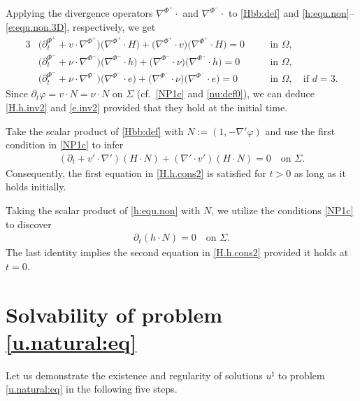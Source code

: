 \documentclass[twoside,11pt]{article}
\numberwithin{equation}{section}
\def\p{\partial}
\begin{document}
Applying the divergence operators $\nabla^{\Phi^+}\cdot$
and $\nabla^{\Phi^-}\cdot$ to \eqref{Hbb:def} and \eqref{h:equ.non}--\eqref{e:equ.non.3D}, respectively, we get
\begin{alignat*}{3}
	&\big(\p_t^{\Phi^+}+v\cdot\nabla^{\Phi^+}\big)\big(\nabla^{\Phi^+}\cdot H\big)+\big(\nabla^{\Phi^+}\cdot v\big)\big(\nabla^{\Phi^+}\cdot H\big)=0\quad&&\textrm{in \ }\Omega,\\
	&\big(\p_t^{\Phi^-}+\nu \cdot\nabla^{\Phi^-}\big)\big(\nabla^{\Phi^-}\cdot h\big)+\big(\nabla^{\Phi^-}\cdot \nu \big)\big(\nabla^{\Phi^-}\cdot h\big)=0\quad&&\textrm{in \ }\Omega,\\
	&\big(\p_t^{\Phi^-}+\nu \cdot\nabla^{\Phi^-}\big)\big(\nabla^{\Phi^-}\cdot e\big)+\big(\nabla^{\Phi^-}\cdot \nu \big)\big(\nabla^{\Phi^-}\cdot e\big)=0\quad&&\textrm{in \ }\Omega,
	\quad\textrm{if }d=3.
\end{alignat*}
Since $\p_t\varphi=v \cdot N=\nu \cdot N$ on $\Sigma$ (cf.~\eqref{NP1c} and \eqref{nu:def0}),
we can deduce \eqref{H.h.inv2} and \eqref{e.inv2} provided that they hold at the initial time.
	
Take the scalar product of \eqref{Hbb:def} with $N:=(1, -\nabla'\varphi)$ and use the first condition in
\eqref{NP1c} to infer
\begin{align*}
	(\p_t+v'\cdot\nabla')(H\cdot N)+ (\nabla' \cdot v')(H\cdot N)=0\quad \textrm{on \ } \Sigma.
\end{align*}
Consequently, the first equation in \eqref{H.h.cons2} is satisfied for $t>0$ as long as it holds initially.

Taking the scalar product of \eqref{h:equ.non} with $N$, we utilize
the conditions \eqref{NP1c}
to discover
\begin{align*}
	\p_t(h\cdot N)=0\quad\textrm{on \ }\Sigma.
\end{align*}
The last identity implies the second equation in \eqref{H.h.cons2} provided it holds at $t=0$.	
	


\vspace*{2mm}
	\section[Solvability of problem \eqref{u.natural:eq}]{Solvability of problem \eqref{u.natural:eq}} \label{app:D}

Let us demonstrate the existence and regularity of solutions $u^{\natural}$ to problem \eqref{u.natural:eq} in the following five steps.
\end{document}
